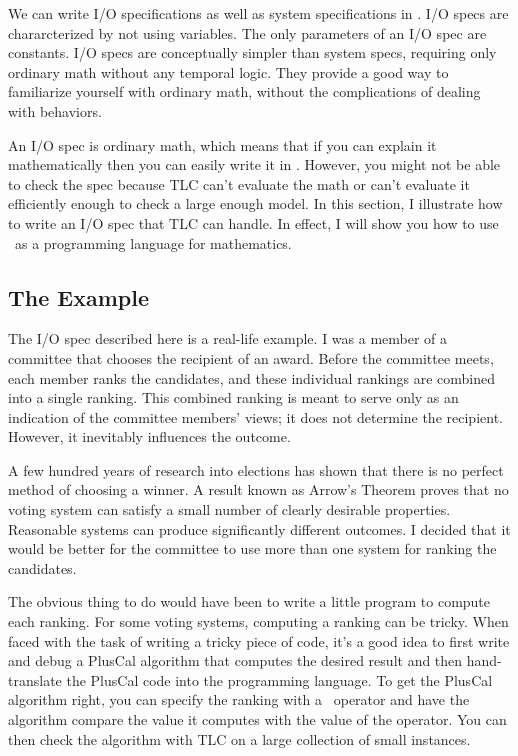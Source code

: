 \documentclass[fleqn,leqno]{article}
\begin{document}
We can write I/O specifications as well as system specifications in
\tlaplus.  I/O specs are chararcterized by not using variables.  The
only parameters of an I/O spec are constants.  I/O specs are
conceptually simpler than system specs, requiring only ordinary math
without any temporal logic.  They provide a good way to familiarize
yourself with ordinary math, without the complications of dealing with
behaviors.  

An I/O spec is ordinary math, which means that if you can explain it
mathematically then you can easily write it in \tlaplus.  However, you
might not be able to check the spec because TLC can't evaluate the
math or can't evaluate it efficiently enough to check a large enough
model.  In this section, I illustrate how to write an I/O spec that
TLC can handle.  In effect, I will show you how to use \tlaplus\ as a
programming language for mathematics.


\subsection{The Example}

The I/O spec described here is a real-life example.  I was a member of
a committee that chooses the recipient of an award.  Before the
committee meets, each member ranks the candidates, and these
individual rankings are combined into a single ranking.  This combined
ranking is meant to serve only as an indication of the committee
members' views; it does not determine the recipient.  However, it
inevitably influences the outcome.

A few hundred years of research into elections has shown that there is
no perfect method of choosing a winner.  A result known as 
Arrow's
Theorem proves that no voting system can satisfy a small number of
clearly desirable properties.  Reasonable systems can produce
significantly different outcomes.  I decided that it would be better
for the committee to use more than one system for ranking the
candidates.

The obvious thing to do would have been to write a little program to
compute each ranking.  For some voting systems, computing a ranking
can be tricky.  When faced with the task of writing a tricky piece of
code, it's a good idea to first write and debug a PlusCal algorithm
that computes the desired result and then hand-translate the PlusCal
code into the programming language.  To get the PlusCal algorithm
right, you can specify the ranking with a \tlaplus\ operator and have
the algorithm compare the value it computes with the value of the
operator.  You can then check the algorithm with TLC on a large
collection of small instances.
\end{document}
